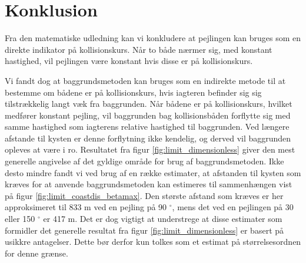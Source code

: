 \documentclass[%
 reprint,
nofootinbib,
aps,
]{revtex4-1}
\begin{document}
\section{Konklusion}
Fra den matematiske udledning kan vi konkludere at pejlingen kan bruges som en direkte indikator på kollisionskurs. Når to både nærmer sig, med konstant hastighed, vil pejlingen være konstant hvis disse er på kollisionskurs. \par
Vi fandt dog at baggrundsmetoden kan bruges som en indirekte metode til at bestemme om bådene er på kollisionskurs, hvis iagteren befinder sig sig tilstrækkelig langt væk fra baggrunden. Når bådene er på kollisionskurs, hvilket medfører konstant pejling, vil baggrunden bag kollisionsbåden forflytte sig med samme hastighed som iagterens relative hastighed til baggrunden. Ved længere afstande til kysten er denne forflytning ikke kendelig, og derved vil baggrunden opleves at være i ro. Resultatet fra figur \ref{fig:limit_dimensionless} giver den mest generelle angivelse af det gyldige område for brug af baggrundsmetoden. Ikke desto mindre fandt vi ved brug af en række estimater, at afstanden til kysten som kræves for at anvende baggrundsmetoden kan estimeres til sammenhængen vist på figur \ref{fig:limit_coastdis_betamax}. Den største afstand som kræves er her approksimeret til 833 m ved en pejling på 90 $^{\circ}$, mens det ved en pejlingen på 30 eller 150 $^{\circ}$ er 417 m. Det er dog vigtigt at understrege at disse estimater som formidler det generelle resultat fra figur \ref{fig:limit_dimensionless} er basert på usikkre antagelser. Dette bør derfor kun tolkes som et estimat på størrelsesordnen for denne grænse.
\end{document}
